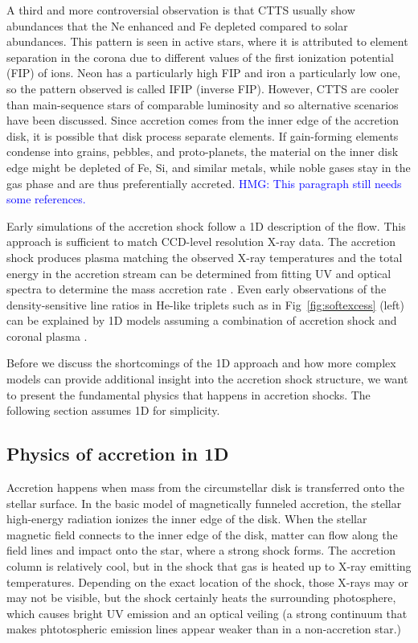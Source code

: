 A third and more controversial observation is that CTTS usually show abundances that the Ne enhanced and Fe depleted compared to solar abundances. This pattern is seen in active stars, where it is attributed to element separation in the corona due to different values of the first ionization potential (FIP) of ions. Neon has a particularly high FIP and iron a particularly low one, so the pattern observed is called IFIP (inverse FIP). However, CTTS are cooler than main-sequence stars of comparable luminosity and so alternative scenarios have been discussed. Since accretion comes from the inner edge of the accretion disk, it is possible that disk process separate elements. If gain-forming elements condense into grains, pebbles, and proto-planets, the material on the inner disk edge might be depleted of Fe, Si, and similar metals, while noble gases stay in the gas phase and are thus preferentially accreted. \textcolor{blue}{HMG: This paragraph still needs some references.}

Early simulations of the accretion shock follow a 1D description of the flow. This approach is sufficient to match CCD-level resolution X-ray data. The accretion shock produces plasma matching the observed X-ray temperatures \citep{lamzin_1998} and the total energy in the accretion stream can be determined from fitting UV and optical spectra to determine the mass accretion rate \citep{calvet_1998}. Even early observations of the density-sensitive line ratios in He-like triplets such as in Fig~\ref{fig:softexcess} (left) can be explained by 1D models assuming a combination of accretion shock and coronal plasma \cite{Guenther_2007}. 

Before we discuss the shortcomings of the 1D approach and how more complex models can provide additional insight into the accretion shock structure, we want to present the fundamental physics that happens in accretion shocks. The following section assumes 1D for simplicity.


\subsection{Physics of accretion in 1D}
\label{sect:accretionphysics}

Accretion happens when mass from the circumstellar disk is transferred onto the stellar surface. In the basic model of magnetically funneled accretion, the stellar high-energy radiation ionizes the inner edge of the disk. When the stellar magnetic field connects to the inner edge of the disk, matter can flow along the field lines and impact onto the star, where a strong shock forms. The accretion column is relatively cool, but in the shock that gas is heated up to X-ray emitting temperatures. Depending on the exact location of the shock, those X-rays may or may not be visible, but the shock certainly heats the surrounding photosphere, which causes bright UV emission and an optical veiling (a strong continuum that makes phtotospheric emission lines appear weaker than in a non-accretion star.)

